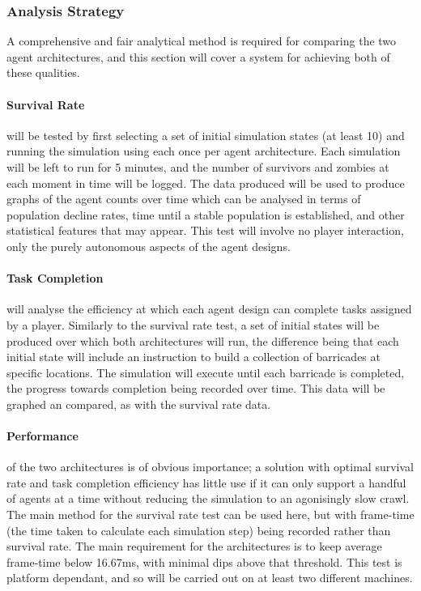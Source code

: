 \documentclass[12pt,a4paper]{article}
\begin{document}
\subsubsection{Analysis Strategy}\noindent
A comprehensive and fair analytical method is required for comparing the two agent architectures, and this section will cover a system for achieving both of these qualities.

\paragraph{Survival Rate} will be tested by first selecting a set of initial simulation states (at least 10) and running the simulation using each once per agent architecture. Each simulation will be left to run for 5 minutes, and the number of survivors and zombies at each moment in time will be logged. The data produced will be used to produce graphs of the agent counts over time which can be analysed in terms of population decline rates, time until a stable population is established, and other statistical features that may appear. This test will involve no player interaction, only the purely autonomous aspects of the agent designs.

\paragraph{Task Completion} will analyse the efficiency at which each agent design can complete tasks assigned by a player. Similarly to the survival rate test, a set of initial states will be produced over which both architectures will run, the difference being that each initial state will include an instruction to build a collection of barricades at specific locations. The simulation will execute until each barricade is completed, the progress towards completion being recorded over time. This data will be graphed an compared, as with the survival rate data.

\paragraph{Performance} of the two architectures is of obvious importance; a solution with optimal survival rate and task completion efficiency has little use if it can only support a handful of agents at a time without reducing the simulation to an agonisingly slow crawl. The main method for the survival rate test can be used here, but with frame-time (the time taken to calculate each simulation step) being recorded rather than survival rate. The main requirement for the architectures is to keep average frame-time below 16.67ms, with minimal dips above that threshold. This test is platform dependant, and so will be carried out on at least two different machines.
\end{document}
